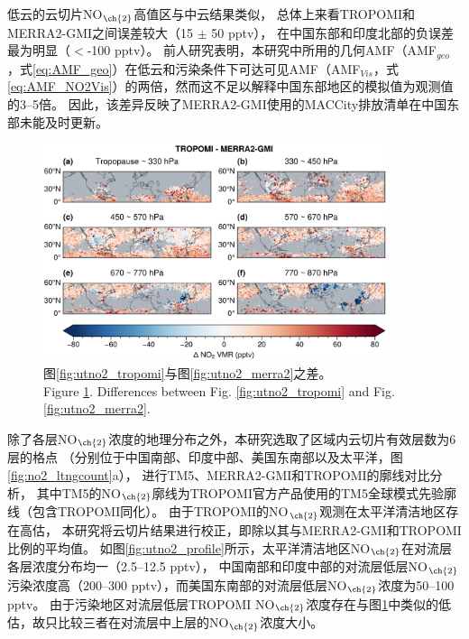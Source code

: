 低云的云切片NO$_{\ch{2}}$高值区与中云结果类似，
总体上来看TROPOMI和MERRA2-GMI之间误差较大（15 $\pm$ 50 pptv），
在中国东部和印度北部的负误差最为明显（$<$-100 pptv）。
前人研究表明，本研究中所用的几何AMF（AMF$_{geo}$，式\ref{eq:AMF_geo}）在低云和污染条件下可达可见AMF（AMF$_{Vis}$，式\ref{eq:AMF_NO2Vis}）的两倍\citep{BelmonteRivas.2015}，然而这不足以解释中国东部地区的模拟值为观测值的3--5倍。
因此，该差异反映了MERRA2-GMI使用的MACCity排放清单在中国东部未能及时更新。


\begin{figure}[H]
    \centering
    \includegraphics[width=0.9\textwidth]{./figures/utno2_delta.png}
    \caption{
    图\ref{fig:utno2_tropomi}与图\ref{fig:utno2_merra2}之差。 \\
    Figure \ref{fig:utno2_delta}. Differences between Fig. \ref{fig:utno2_tropomi} and Fig. \ref{fig:utno2_merra2}.
    }
    \label{fig:utno2_delta}
\end{figure}



除了各层NO$_{\ch{2}}$浓度的地理分布之外，本研究选取了区域内云切片有效层数为6层的格点
（分别位于中国南部、印度中部、美国东南部以及太平洋，图\ref{fig:no2_ltngcount}a），
进行TM5、MERRA2-GMI和TROPOMI的廓线对比分析，
其中TM5的NO$_{\ch{2}}$廓线为TROPOMI官方产品使用的TM5全球模式先验廓线（包含TROPOMI同化）。
由于TROPOMI的NO$_{\ch{2}}$观测在太平洋清洁地区存在高估，
本研究将云切片结果进行校正，即除以其与MERRA2-GMI和TROPOMI比例的平均值。
如图\ref{fig:utno2_profile}所示，太平洋清洁地区NO$_{\ch{2}}$在对流层各层浓度分布均一（2.5--12.5 pptv），
中国南部和印度中部的对流层低层NO$_{\ch{2}}$污染浓度高（200--300 pptv），而美国东南部的对流层低层NO$_{\ch{2}}$浓度为50--100 pptv。
由于污染地区对流层低层TROPOMI NO$_{\ch{2}}$浓度存在与图\ref{fig:utno2_delta}中类似的低估，故只比较三者在对流层中上层的NO$_{\ch{2}}$浓度大小。


